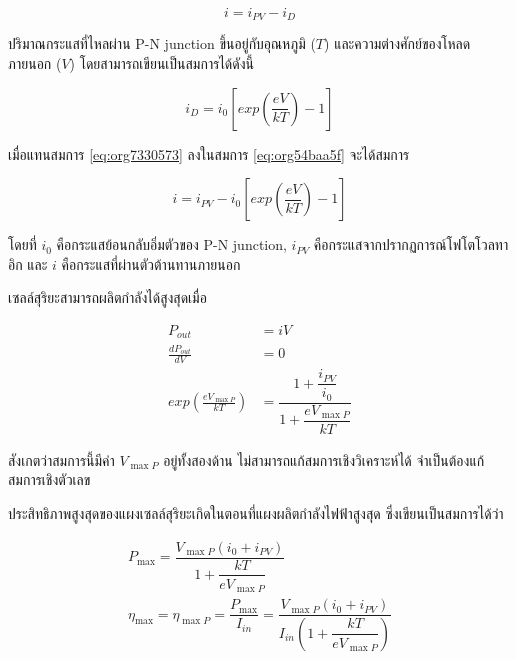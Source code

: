 \documentclass[a4paper,nobib,openany,10pt]{tufte-book}
\begin{document}
\begin{equation}
\label{eq:org54baa5f}
  i = i_{PV} - i_D
\end{equation}

ปริมาณกระแสที่ไหลผ่าน P-N junction ขึ้นอยู่กับอุณหภูมิ (\(T\))
และความต่างศักย์ของโหลดภายนอก (\(V\)) โดยสามารถเขียนเป็นสมการได้ดังนี้

\begin{equation}
\label{eq:org7330573}
  i_D = i_0 \left[ exp \left( \frac{eV}{kT} \right) - 1 \right]
\end{equation}

เมื่อแทนสมการ \ref{eq:org7330573} ลงในสมการ
\ref{eq:org54baa5f} จะได้สมการ

\begin{equation}
\label{eq:org4e9b422}
  i = i_{PV} - i_0\left[exp \left( \frac{eV}{kT} \right) - 1 \right]
\end{equation}

โดยที่ \(i_0\) คือกระแสย้อนกลับอิ่มตัวของ P-N junction, \(i_{PV}\)
คือกระแสจากปรากฏการณ์โฟโตโวลทาอิก และ \(i\)
คือกระแสที่ผ่านตัวต้านทานภายนอก

เซลล์สุริยะสามารถผลิตกำลังได้สูงสุดเมื่อ

\begin{align}
\label{eq:orgb7bf346}
  P_{out} &= i V \nonumber \\
  \frac{dP_{out}}{dV} &= 0 \nonumber \\
  exp \left(\frac{e V_{\max P}}{kT} \right) &= \dfrac{1+\dfrac{i_{PV}}{i_0}}{1+ \dfrac{e V_{\max P}}{kT}}
\end{align}

สังเกตว่าสมการนี้มีค่า \(V_{\max P}\) อยู่ทั้งสองด้าน
ไม่สามารถแก้สมการเชิงวิเคราะห์ได้ จำเป็นต้องแก้สมการเชิงตัวเลข

ประสิทธิภาพสูงสุดของแผงเซลล์สุริยะเกิดในตอนที่แผงผลิตกำลังไฟฟ้าสูงสุด
ซึ่งเขียนเป็นสมการได้ว่า

\begin{gather*}
\label{eq:orge17486e}
  P_{\max} =  \dfrac{V_{\max P} ( i_0 + i_{PV} )}{1 + \dfrac{kT}{e V_{\max P}}} \\
  \eta_{\max} = \eta_{\max P} =  \dfrac{P_{\max}}{I_{in}} = \dfrac{V_{\max P} ( i_0 + i_{PV} )}{I_{in} \left(1 + \dfrac{kT}{e V_{\max P}} \right)}
\end{gather*}
\end{document}

